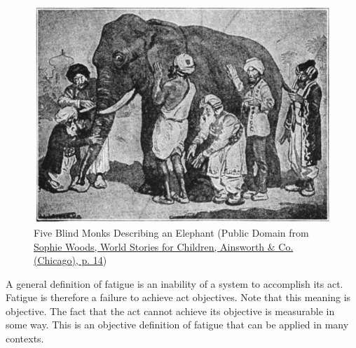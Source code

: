 \begin{figure}[!h]
    \centering
    \includegraphics[width=1\linewidth]{./figure/elephant.jpg}
    \caption{Five Blind Monks Describing an Elephant (\footnotesize{Public Domain from \href{https://commons.wikimedia.org/wiki/File:Blind_men_and_elephant.png}{Sophie Woods, World Stories for Children, Ainsworth & Co. (Chicago), p. 14}})}
    \label{fig:elephant}
\end{figure}

A general definition of fatigue is an inability of a system\footnotemark{} to accomplish its act. Fatigue is therefore a failure to achieve act objectives. Note that this meaning is objective. The fact that the act cannot achieve its objective is measurable in some way. This is an objective definition of fatigue that can be applied in many contexts.

